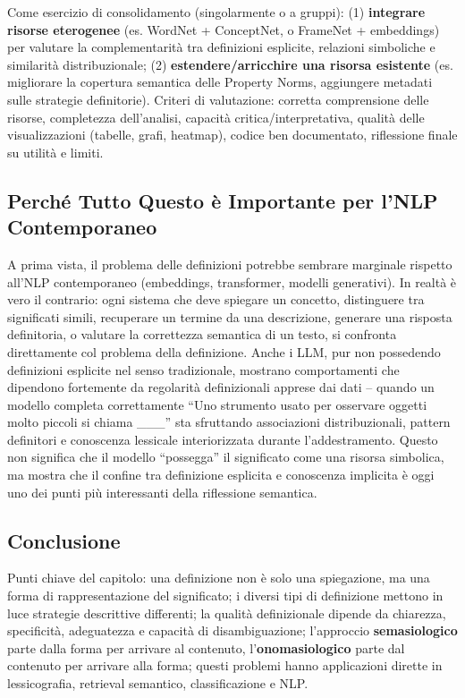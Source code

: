 \documentclass[12pt,a4paper]{article}
\begin{document}
Come esercizio di consolidamento (singolarmente o a gruppi): (1) \textbf{integrare risorse eterogenee} (es. WordNet + ConceptNet, o FrameNet + embeddings) per valutare la complementarit\`a tra definizioni esplicite, relazioni simboliche e similarit\`a distribuzionale; (2) \textbf{estendere/arricchire una risorsa esistente} (es. migliorare la copertura semantica delle Property Norms, aggiungere metadati sulle strategie definitorie). Criteri di valutazione: corretta comprensione delle risorse, completezza dell'analisi, capacit\`a critica/interpretativa, qualit\`a delle visualizzazioni (tabelle, grafi, heatmap), codice ben documentato, riflessione finale su utilit\`a e limiti.

\subsection{Perch\'e Tutto Questo \`e Importante per l'NLP Contemporaneo}

\begin{quizbox}
A prima vista, il problema delle definizioni potrebbe sembrare marginale rispetto all'NLP contemporaneo (embeddings, transformer, modelli generativi). In realt\`a \`e vero il contrario: ogni sistema che deve spiegare un concetto, distinguere tra significati simili, recuperare un termine da una descrizione, generare una risposta definitoria, o valutare la correttezza semantica di un testo, si confronta direttamente col problema della definizione. Anche i LLM, pur non possedendo definizioni esplicite nel senso tradizionale, mostrano comportamenti che dipendono fortemente da regolarit\`a definizionali apprese dai dati -- quando un modello completa correttamente ``Uno strumento usato per osservare oggetti molto piccoli si chiama \_\_\_'' sta sfruttando associazioni distribuzionali, pattern definitori e conoscenza lessicale interiorizzata durante l'addestramento. Questo non significa che il modello ``possegga'' il significato come una risorsa simbolica, ma mostra che il confine tra definizione esplicita e conoscenza implicita \`e oggi uno dei punti pi\`u interessanti della riflessione semantica.
\end{quizbox}

\subsection{Conclusione}

Punti chiave del capitolo: una definizione non \`e solo una spiegazione, ma una forma di rappresentazione del significato; i diversi tipi di definizione mettono in luce strategie descrittive differenti; la qualit\`a definizionale dipende da chiarezza, specificit\`a, adeguatezza e capacit\`a di disambiguazione; l'approccio \textbf{semasiologico} parte dalla forma per arrivare al contenuto, l'\textbf{onomasiologico} parte dal contenuto per arrivare alla forma; questi problemi hanno applicazioni dirette in lessicografia, retrieval semantico, classificazione e NLP.
\end{document}

